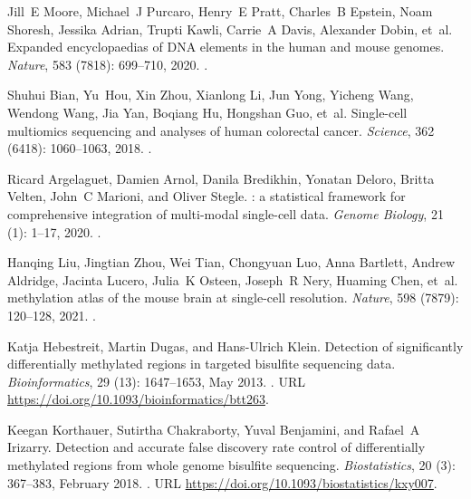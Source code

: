 \documentclass[10pt]{article}
\begin{document}
\begin{thebibliography}{31}
	Jill~E Moore, Michael~J Purcaro, Henry~E Pratt, Charles~B Epstein, Noam
	Shoresh, Jessika Adrian, Trupti Kawli, Carrie~A Davis, Alexander Dobin,
	et~al.
	\newblock Expanded encyclopaedias of {DNA} elements in the human and mouse
	genomes.
	\newblock \emph{Nature}, 583 (7818): 699--710, 2020.
	\newblock {}.
	
	Shuhui Bian, Yu~Hou, Xin Zhou, Xianlong Li, Jun Yong, Yicheng Wang, Wendong
	Wang, Jia Yan, Boqiang Hu, Hongshan Guo, et~al.
	\newblock Single-cell multiomics sequencing and analyses of human colorectal
	cancer.
	\newblock \emph{Science}, 362 (6418): 1060--1063, 2018.
	\newblock {}.
	
	Ricard Argelaguet, Damien Arnol, Danila Bredikhin, Yonatan Deloro, Britta
	Velten, John~C Marioni, and Oliver Stegle.
	: a statistical framework for comprehensive integration of
	multi-modal single-cell data.
	\newblock \emph{Genome Biology}, 21 (1): 1--17, 2020.
	\newblock {}.
	
	Hanqing Liu, Jingtian Zhou, Wei Tian, Chongyuan Luo, Anna Bartlett, Andrew
	Aldridge, Jacinta Lucero, Julia~K Osteen, Joseph~R Nery, Huaming Chen, et~al.
	 methylation atlas of the mouse brain at single-cell resolution.
	\newblock \emph{Nature}, 598 (7879): 120--128, 2021.
	\newblock {}.
	
	Katja Hebestreit, Martin Dugas, and Hans-Ulrich Klein.
	\newblock Detection of significantly differentially methylated regions in
	targeted bisulfite sequencing data.
	\newblock \emph{Bioinformatics}, 29 (13): 1647--1653, May
	2013.
	\newblock {}.
	\newblock URL \url{https://doi.org/10.1093/bioinformatics/btt263}.
	
	Keegan Korthauer, Sutirtha Chakraborty, Yuval Benjamini, and Rafael~A Irizarry.
	\newblock Detection and accurate false discovery rate control of differentially
	methylated regions from whole genome bisulfite sequencing.
	\newblock \emph{Biostatistics}, 20 (3): 367--383, February
	2018.
	\newblock {}.
	\newblock URL \url{https://doi.org/10.1093/biostatistics/kxy007}.
	

\end{thebibliography}
\end{document}
